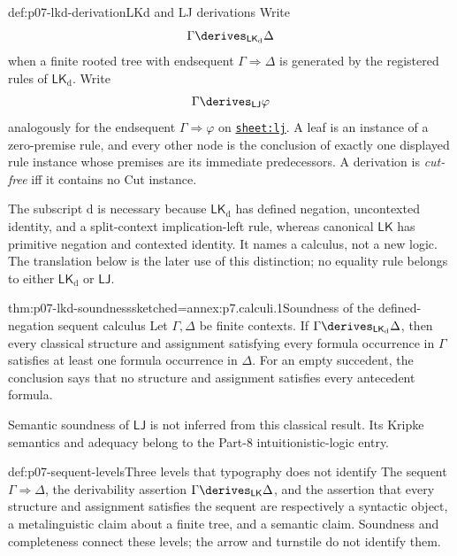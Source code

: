 \begin{hbdefinition}{def:p07-lkd-derivation}{LKd and LJ derivations}
Write
\[
 \Gamma\derives_{\mathsf{LK}_{\mathrm d}}\Delta
\]
when a finite rooted tree with endsequent
\(\Gamma\Rightarrow\Delta\) is generated by the registered rules of
\(\mathsf{LK}_{\mathrm d}\).  Write
\[
 \Gamma\derives_{\mathsf{LJ}}\varphi
\]
analogously for the endsequent
\(\Gamma\Rightarrow\varphi\) on
\hyperref[sheet:lj]{\texttt{sheet:lj}}.  A leaf is an instance of a
zero-premise rule, and every other node is the conclusion of exactly one
displayed rule instance whose premises are its immediate predecessors.  A
derivation is \emph{cut-free} iff it contains no Cut instance.

The subscript \(\mathrm d\) is necessary because
\(\mathsf{LK}_{\mathrm d}\) has defined negation, uncontexted identity, and a
split-context implication-left rule, whereas canonical \(\mathsf{LK}\) has
primitive negation and contexted identity.  It names a calculus, not a new
logic.  The translation below is the later use of this distinction; no
equality rule belongs to either \(\mathsf{LK}_{\mathrm d}\) or
\(\mathsf{LJ}\).
\end{hbdefinition}

\begin{hbtheorem}{thm:p07-lkd-soundness}{sketched=annex:p7.calculi.1}{Soundness of the defined-negation sequent calculus}
Let \(\Gamma,\Delta\) be finite contexts.  If
\(\Gamma\derives_{\mathsf{LK}_{\mathrm d}}\Delta\), then every
classical structure and assignment satisfying every formula occurrence in
\(\Gamma\) satisfies at least one formula occurrence in \(\Delta\).  For an
empty succedent, the conclusion says that no structure and assignment
satisfies every antecedent formula.
\end{hbtheorem}

Semantic soundness of \(\mathsf{LJ}\) is not inferred from this classical
result.  Its Kripke semantics and adequacy belong to the Part-8
intuitionistic-logic entry.

\begin{hbwarning}{def:p07-sequent-levels}{Three levels that typography does not identify}
The sequent \(\Gamma\Rightarrow\Delta\), the derivability assertion
\(\Gamma\derives_{\mathsf{LK}}\Delta\), and the assertion that every
structure and assignment satisfies the sequent are respectively a syntactic
object, a metalinguistic claim about a finite tree, and a semantic claim.
Soundness and completeness connect these levels; the arrow and turnstile do
not identify them.
\end{hbwarning}

